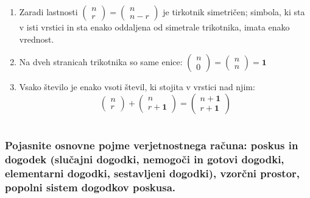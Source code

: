 \documentclass{article}
\begin{document}
\begin{enumerate}
  \item Zaradi lastnosti $\left(\begin{array}{l}n \\ r\end{array}\right)=\left(\begin{array}{c}n \\ n-r\end{array}\right)$ je tirkotnik simetričen; simbola, ki sta v isti vrstici in sta enako oddaljena od simetrale trikotnika, imata enako vrednost.

  \item Na dveh stranicah trikotnika so same enice: $\left(\begin{array}{l}n \\ 0\end{array}\right)=\left(\begin{array}{l}n \\ n\end{array}\right)=\mathbf{1}$

  \item Vsako število je enako vsoti števil, ki stojita v vrstici nad njim:
    $$
\left(\begin{array}{l}
n \\
r
\end{array}\right)+\left(\begin{array}{c}
n \\
r+\mathbf{1}
\end{array}\right)=\left(\begin{array}{l}
n+\mathbf{1} \\
r+\mathbf{1}
\end{array}\right)
$$
\end{enumerate}

\section{\texorpdfstring{}{Verjetnostni račun}}
\subsubsection*{Pojasnite osnovne pojme verjetnostnega računa: poskus in dogodek (slučajni dogodki, nemogoči in gotovi dogodki, elementarni dogodki, sestavljeni dogodki), vzorčni prostor, popolni sistem dogodkov poskusa.}
\end{document}
